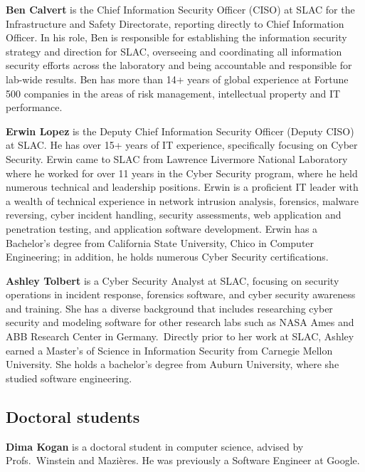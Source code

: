 \documentclass[11pt]{article}
\newcommand{\slim}{\vspace{\baselineskip}}
\begin{document}
\noindent \textbf{Ben Calvert} is the Chief Information Security
Officer (CISO) at SLAC for the Infrastructure and Safety Directorate,
reporting directly to Chief Information Officer. In his role, Ben is
responsible for establishing the information security strategy and
direction for SLAC, overseeing and coordinating all information
security efforts across the laboratory and being accountable and
responsible for lab-wide results. Ben has more than 14+ years of
global experience at Fortune 500 companies in the areas of risk
management, intellectual property and IT performance.

\slim

\noindent \textbf{Erwin Lopez} is the Deputy Chief Information
Security Officer (Deputy CISO) at SLAC. He has over 15+ years of IT
experience, specifically focusing on Cyber Security. Erwin came to
SLAC from Lawrence Livermore National Laboratory where he worked for
over 11 years in the Cyber Security program, where he held numerous
technical and leadership positions. Erwin is a proficient IT leader
with a wealth of technical experience in network intrusion analysis,
forensics, malware reversing, cyber incident handling, security
assessments, web application and penetration testing, and application
software development. Erwin has a Bachelor's degree from California
State University, Chico in Computer Engineering; in addition, he holds
numerous Cyber Security certifications.

\slim

\noindent \textbf{Ashley Tolbert} is a Cyber Security Analyst at SLAC,
focusing on security operations in incident response, forensics
software, and cyber security awareness and training. She has a diverse
background that includes researching cyber security and modeling
software for other research labs such as NASA Ames and ABB Research
Center in Germany. Directly prior to her work at SLAC, Ashley earned a
Master's of Science in Information Security from Carnegie Mellon
University. She holds a bachelor’s degree from Auburn University,
where she studied software engineering.  \slim

\subsection{Doctoral students}

\noindent \textbf{Dima Kogan} is a doctoral student in computer science,
advised by Profs.~Winstein and Mazi\`{e}res. He was previously a Software
Engineer at Google.
\end{document}
